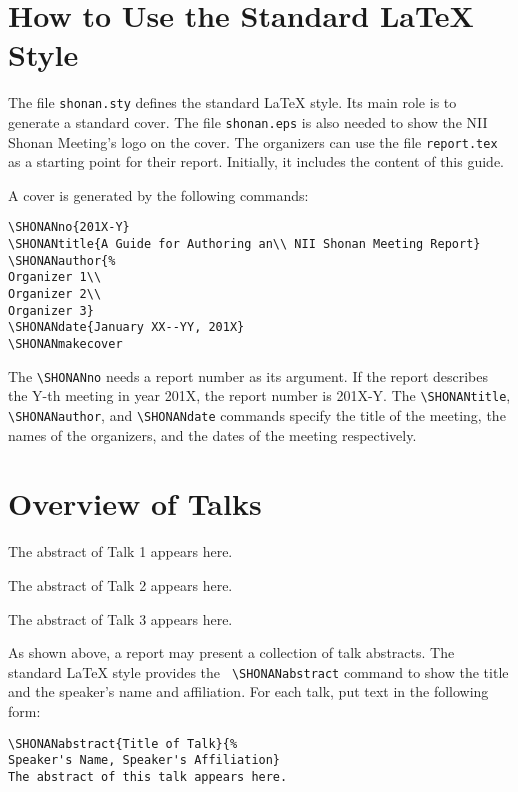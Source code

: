 \documentclass[a4paper]{article}
\begin{document}
\clearpage

\section*{How to Use the Standard \LaTeX{} Style}
The file {\tt shonan.sty} defines the standard \LaTeX{} style.  Its
main role is to generate a standard cover.  The file {\tt shonan.eps}
is also needed to show the NII Shonan Meeting's logo on the cover.
The organizers can use the file {\tt report.tex} as a starting point
for their report.  Initially, it includes the content of this guide.

A cover is generated by the following commands:
\begin{verbatim}
\SHONANno{201X-Y}
\SHONANtitle{A Guide for Authoring an\\ NII Shonan Meeting Report}
\SHONANauthor{%
Organizer 1\\
Organizer 2\\
Organizer 3}
\SHONANdate{January XX--YY, 201X}
\SHONANmakecover
\end{verbatim}
The {\tt \textbackslash{}SHONANno} needs a report number as its
argument.  If the report describes the Y-th meeting in year 201X, the
report number is 201X-Y.  The {\tt \textbackslash{}SHONANtitle}, {\tt
  \textbackslash{}SHONANauthor}, and {\tt \textbackslash{}SHONANdate}
commands specify the title of the meeting, the names of the
organizers, and the dates of the meeting respectively.

\clearpage

\section*{Overview of Talks}
The abstract of Talk 1 appears here.

The abstract of Talk 2 appears here.

The abstract of Talk 3 appears here.

\bigskip

As shown above, a report may present a collection of talk abstracts.
The standard \LaTeX{} style provides the {\tt
  \textbackslash{}SHONANabstract} command to show the title and the
speaker's name and affiliation.  For each talk, put text in the
following form:
\begin{verbatim}
\SHONANabstract{Title of Talk}{%
Speaker's Name, Speaker's Affiliation}
The abstract of this talk appears here.
\end{verbatim}
\end{document}
